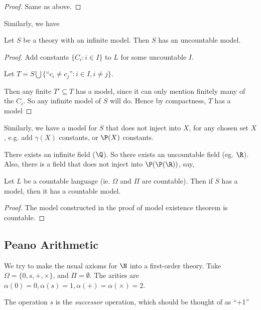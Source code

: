 \documentclass[a4paper]{article}
\begin{document}
\begin{proof}
  Same as above.
\end{proof}

Similarly, we have
\begin{cor}
  Let $S$ be a theory with an infinite model. Then $S$ has an uncountable model.
\end{cor}

\begin{proof}
  Add constants $\{C_i: i\in I\}$ to $L$ for some uncountable $I$.

  Let $T = S\bigcup\{\text{``}c_i \not= c_j\text{''}: i\in I, i \not = j\}$.

  Then any finite $T' \subseteq T$ has a model, since it can only mention finitely many of the $C_i$. So any infinite model of $S$ will do. Hence by compactness, $T$ has a model
\end{proof}
Similarly, we have a model for $S$ that does not inject into $X$, for any chosen set $X$, e.g. add $\gamma(X)$ constants, or $\P(X)$ constants.

\begin{eg}
  There exists an infinite field ($\Q$). So there exists an uncountable field (eg. $\R$). Also, there is a field that does not inject into $\P(\P(\R))$, say,
\end{eg}

\begin{thm}
  Let $L$ be a countable language (ie. $\Omega$ and $\Pi$ are countable). Then if $S$ has a model, then it has a countable model.
\end{thm}

\begin{proof}
  The model constructed in the proof of model existence theorem is countable.
\end{proof}

\subsection{Peano Arithmetic}
We try to make the usual axioms for $\N$ into a first-order theory. Take $\Omega = \{0, s, +, \times\}$, and $\Pi = \emptyset$. The arities are $\alpha(0) = 0, \alpha(s) = 1, \alpha(+) = \alpha(\times) = 2$.

The operation $s$ is the \emph{successor} operation, which should be thought of as  ``+1''
\end{document}
